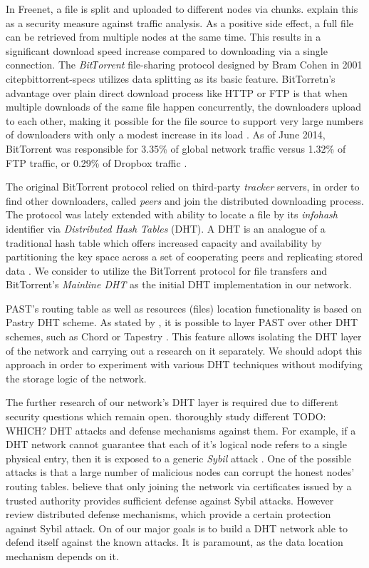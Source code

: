 In Freenet, a file is split and uploaded to different nodes via chunks.
\citet{dark-freenet} explain this as a security measure against traffic
analysis. As a positive side effect, a full file can be retrieved from
multiple nodes at the same time. This results in a significant download
speed increase compared to downloading via a single connection.
The \emph{BitТorrent} file-sharing protocol designed by Bram Cohen in 2001
citep{bittorrent-specs} utilizes data splitting as its basic feature.
BitTorretn's advantage over plain direct download process like HTTP or FTP
is that when multiple downloads of the same file happen concurrently,
the downloaders upload to each other, making it possible for the file
source to support very large numbers of downloaders with only a modest
increase in its load \citep{bittorrent-specs}.
As of June 2014, BitTorrent was responsible for 3.35\% of global
network traffic versus 1.32\% of FTP traffic, or 0.29\% of
Dropbox traffic \citep{paloalto:traffic}.

The original BitTorrent protocol relied on third-party \emph{tracker}
servers, in order to find other downloaders, called \emph{peers} and
join the distributed downloading process.
The protocol was lately extended with ability to locate a file by
its \emph{infohash} identifier via \emph{Distributed Hash Tables} (DHT).
A DHT is an analogue of a traditional hash table which offers increased
capacity and availability by partitioning the key space across a set
of cooperating peers and replicating stored data \cite{opendht}.
We consider to utilize the BitTorrent protocol for file transfers
and BitTorrent's \emph{Mainline DHT} \citep{bittorrent-dht} as the
initial DHT implementation in our network.

PAST's routing table as well as resources (files) location functionality
is based on Pastry \citep{pastry} DHT scheme. As stated by
\citet{past}, it is possible to layer PAST over other DHT schemes,
such as Chord \citep{chord-01} or Tapestry \citep{tapestry}.
This feature allows isolating the DHT layer of the network and
carrying out a research on it separately. We should adopt this
approach in order to experiment with various DHT techniques without
modifying the storage logic of the network.

The further research of our network's DHT layer is required due to
different security questions which remain open.
\citet{dht-security-survey} thoroughly study different TODO: WHICH?
DHT attacks
and defense mechanisms against them. For example,
if a DHT network cannot guarantee that each of it's logical node
refers to a single physical entry, then it is exposed to a
generic \emph{Sybil} attack \citep{sybil}. One of the possible
attacks is that a large number of malicious nodes can corrupt the
honest nodes' routing tables.
\citet{dht-security-survey} believe that only joining the network
via certificates issued by a trusted authority provides sufficient
defense against Sybil attacks. However \citet{dht-security-survey}
review distributed defense mechanisms, which provide a certain
protection against Sybil attack.
On of our major goals is to build a DHT network able to defend itself
against the known attacks. It is paramount, as the data location
mechanism depends on it.

